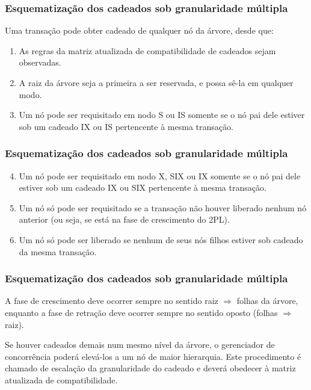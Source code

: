 \documentclass{beamer}
\begin{document}

\begin{frame} %
    \frametitle{Esquematização dos cadeados sob granularidade múltipla}
    
    Uma transação pode obter cadeado de qualquer nó da árvore, desde que:

    \medskip
    \begin{enumerate}
        \item As regras da matriz atualizada de compatibilidade de cadeados sejam observadas.
        \item A raiz da árvore seja a primeira a ser reservada, e possa sê-la em qualquer modo.
        \item Um nó pode ser requisitado em nodo S ou IS somente se o nó pai dele estiver sob um cadeado IX ou IS pertencente à mesma transação.
    \end{enumerate}
\end{frame}


\begin{frame} %
    \frametitle{Esquematização dos cadeados sob granularidade múltipla}

    \begin{enumerate}
        \setcounter{enumi}{3}
        \item Um nó pode ser requisitado em nodo X, SIX ou IX somente se o nó pai dele estiver sob um cadeado IX ou SIX pertencente à mesma transação.
        \item Um nó só pode ser requisitado se a transação não houver liberado nenhum nó anterior (ou seja, se está na fase de crescimento do 2PL).
        \item Um nó só pode ser liberado se nenhum de seus nós filhos estiver sob cadeado da mesma transação.
    \end{enumerate}
    
\end{frame}


\begin{frame} %
    \frametitle{Esquematização dos cadeados sob granularidade múltipla}
    
    A fase de crescimento deve ocorrer sempre no sentido raiz $\Rightarrow$ folhas da árvore, enquanto a fase de retração deve ocorrer sempre no sentido oposto (folhas $\Rightarrow$ raiz).

    \medskip
    Se houver cadeados demais num mesmo nível da árvore, o gerenciador de concorrência poderá elevá-los a um nó de maior hierarquia. Este procedimento é chamado de escalação da granularidade do cadeado e deverá obedecer à matriz atualizada de compatibilidade.
\end{frame}
\end{document}
